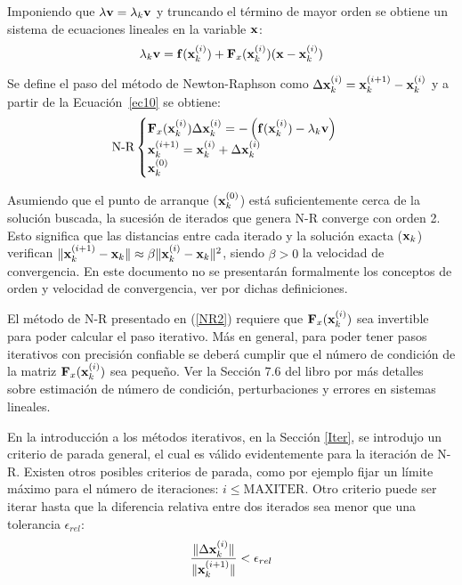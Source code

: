 Imponiendo que $\lambda {\bf v}=\lambda_k {\bf v}$ y truncando el término de mayor orden se obtiene un sistema de ecuaciones  lineales en la variable ${\bf x}$:
%
\begin{equation}\label{ec10}
\lambda_k {\bf v} = {\bf f}({\bf x}_k^{(i)})+{\bf F}_x({\bf x}_k^{(i)})({\bf x}-{\bf x}_k^{(i)})
\end{equation}

Se define el paso del método de Newton-Raphson como $\Delta {\bf x}_k^{(i)}={\bf x}_k^{(i+1)}-{\bf x}_k^{(i)}$ y a partir de la Ecuación~\eqref{ec10} se obtiene:
%
\begin{equation}\label{NR2}
\text{N-R}
\begin{cases} 
	{\bf F}_x({\bf x}_k^{(i)})\Delta {\bf x}_k^{(i)} =-\left({\bf f}({\bf x}_k^{(i)})-\lambda_k {\bf v}\right)\\
	{\bf x}_k^{(i+1)}={\bf x}_k^{(i)}+\Delta {\bf x}_k^{(i)} \\
	{\bf x}_k^{(0)}
\end{cases}
\end{equation}


Asumiendo que el punto de arranque (${\bf x}_k^{(0)}$) está suficientemente cerca de la solución buscada, la sucesión de iterados que genera N-R converge con orden 2. Esto significa que las distancias entre cada iterado y la solución exacta (${\bf x}_k$) verifican $\|{\bf x}_k^{(i+1)}-{\bf x}_k\| \approx \beta \|{\bf x}_k^{(i)}-{\bf x}_k\|^2$, siendo $\beta>0$ la velocidad de convergencia. %
%
En este documento no se presentarán formalmente los conceptos de orden y velocidad de convergencia, ver \citep{quarteroni2007numeric} por dichas definiciones.

El método de N-R presentado en (\ref{NR2}) requiere que ${\bf F}_x({\bf x}_k^{(i)})$ sea invertible para poder calcular el paso iterativo. Más en general, para poder tener pasos iterativos con precisión confiable se deberá cumplir que el número de condición de la matriz ${\bf F}_x({\bf x}_k^{(i)})$ sea pequeño. Ver la Sección 7.6 del libro \citep{dahquist2008numeric} por más detalles sobre estimación de número de condición, perturbaciones y errores en sistemas lineales.

En la introducción a los métodos iterativos, en la Sección \ref{Iter}, se introdujo un criterio de parada general, el cual es válido evidentemente para la iteración de N-R. Existen otros posibles criterios de parada, como por ejemplo fijar un límite máximo para el número de iteraciones: $i\leq \text{MAXITER}$. Otro criterio puede ser iterar hasta que la diferencia relativa entre dos iterados sea menor que una tolerancia $\epsilon_{rel}$:
%
\begin{equation}
	\frac{\|\Delta {\bf x}_k^{(i)}\|}{\|{\bf x}_k^{(i+1)}\|} < \epsilon_{rel}
\end{equation}

